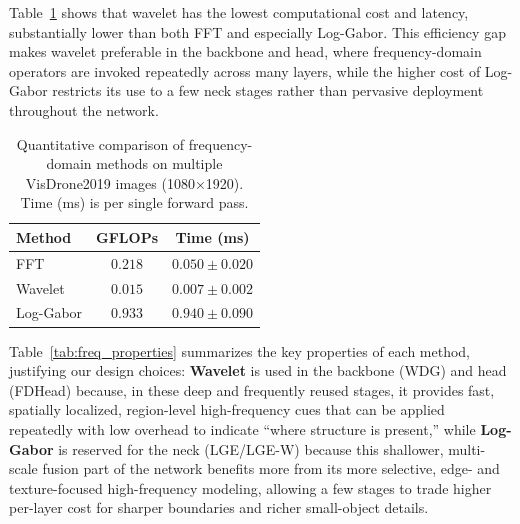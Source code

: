 \documentclass{article}
\theoremstyle{plain}
\theoremstyle{definition}
\theoremstyle{remark}
\begin{document}
Table~\ref{tab:freq_quantitative} shows that wavelet has the lowest computational cost and latency, substantially lower than both FFT and especially Log-Gabor. This efficiency gap makes wavelet preferable in the backbone and head, where frequency-domain operators are invoked repeatedly across many layers, while the higher cost of Log-Gabor restricts its use to a few neck stages rather than pervasive deployment throughout the network.

\begin{table}[h]
\centering
\caption{Quantitative comparison of frequency-domain methods on multiple VisDrone2019 images (1080×1920). Time (ms) is per single forward pass.}
\label{tab:freq_quantitative}
\vspace{0.1cm}
\small
\begin{tabular}{@{}lcc@{}}
\toprule
\cellcolor{blue!5}\textbf{Method} & \cellcolor{blue!5}\textbf{GFLOPs} & \cellcolor{blue!5}\textbf{Time (ms)} \\
\midrule
FFT & $0.218$ & $0.050 \pm 0.020$ \\
Wavelet & $0.015$ & $0.007 \pm 0.002$ \\
Log-Gabor & $0.933$ & $0.940 \pm 0.090$ \\
\bottomrule
\end{tabular}
\end{table}

Table~\ref{tab:freq_properties} summarizes the key properties of each method, justifying our design choices: \textbf{Wavelet} is used in the backbone (WDG) and head (FDHead) because, in these deep and frequently reused stages, it provides fast, spatially localized, region-level high-frequency cues that can be applied repeatedly with low overhead to indicate “where structure is present,” while \textbf{Log-Gabor} is reserved for the neck (LGE/LGE-W) because this shallower, multi-scale fusion part of the network benefits more from its more selective, edge- and texture-focused high-frequency modeling, allowing a few stages to trade higher per-layer cost for sharper boundaries and richer small-object details.
\end{document}
